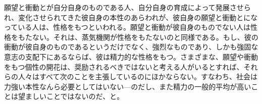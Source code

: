 願望と衝動とが自分自身のものである人、自分自身の育成によって発展させられ、変化させられてきた彼自身の本性のあらわれが、彼自身の願望と衝動とになっている人は、性格をもつといわれる。願望と衝動が彼自身のものでない人は性格をもたない。それは、蒸気機関が性格をもたないのと同様である。もし、彼の衝動が彼自身のものであるというだけでなく、強烈なものであり、しかも強固な意志の支配下にあるならば、彼は精力的な性格をもつ。さまざまな、願望や衝動をもつ個性の開花は、奨励されるべきではないと考える人がいるとすれば、それらの人々はすべて次のことを主張しているのにほかならない。すなわち、社会は力強い本性なんら必要としてはいない{\——}のだし、また精力の一般的平均が高いことは望ましいことではないのだ、と。






